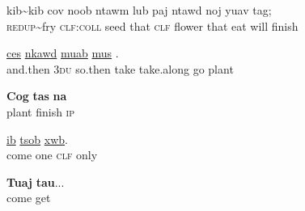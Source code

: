 \documentclass[output=paper]{LSP/langsci}
\begin{document}
\begin{exe}
 \label{JaexApp28}
\gll kib{\textasciitilde}kib cov noob ntawm lub paj ntawd noj yuav tag;\\
     \textsc{redup}{\textasciitilde}fry \textsc{clf:coll} seed that \textsc{clf} flower that eat will finish\\
\glt {}
\end{exe}

\begin{exe}
 \label{JaexApp29}
\gll  \underline{ces}  \underline{nkawd}  \underline{}  \underline{muab}  \underline{}  \underline{mus}  \underline{}.\\
     and.then \textsc{3du} so.then take take.along go plant\\
\glt {}
\end{exe}

\begin{exe}
 \label{JaexApp30}
\gll \textbf{Cog} \textbf{tas} \textbf{na}\\
     plant finish \textsc{ip}\\
\glt {}
\end{exe}


\begin{exe}
 \label{JaexApp31}
\gll \underline{} \underline{ib} \underline{tsob} \underline{xwb}.\\
     come one \textsc{clf} only\\
\glt {}
\end{exe}

\begin{exe}
 \label{JaexApp32}
\gll \textbf{Tuaj} \textbf{tau}...\\
     come get\\
\glt {}
\end{exe}

\pagebreak
\end{document}
